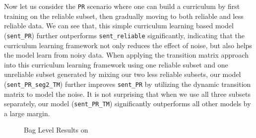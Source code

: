 Now let us consider the \texttt{PR} scenario where one can build a curriculum by first training on the
reliable subset, then gradually moving to both reliable and less
reliable data. We can see that, this simple curriculum learning based model
(\texttt{sent\_PR}) further outperforms \texttt{sent\_reliable} significantly,
indicating that the curriculum learning framework not only reduces the effect
of noise, but also helps the model learn from noisy data. When applying the
transition matrix approach into this curriculum learning framework using one reliable
subset and one unreliable subset generated by mixing our two less reliable subsets, our model (\texttt{sent\_PR\_seg2\_TM})
further improves \texttt{sent\_PR} by  %
utilizing the dynamic transition matrix to model the noise.
It is not surprising that when we use all three subsets separately,
our model (\texttt{sent\_PR\_TM}) significantly outperforms all
other models by a large margin.

\begin{figure}[t!]
\setlength{\belowcaptionskip}{-10pt}
\centering
{}
\caption{Bag Level Results on \TimeRE}
\label{fig: results_on_luo}
\end{figure}



